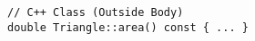 \documentclass[7pt, twocolumn]{extarticle}
\newcommand{\myinline}[1]{\lstinline[basicstyle={\fontsize{5pt}{6}\ttfamily}]{#1}}
\begin{document}
\begin{small}
\begin{minipage}[h]{4.8cm}
\begin{tcolorbox}
\begin{lstlisting}[style = mystyle]
// C++ Class (Outside Body)
double Triangle::area() const { ... }
\end{lstlisting}
   \end{tcolorbox}

    \end{minipage}
    


\end{small}
\end{document}

